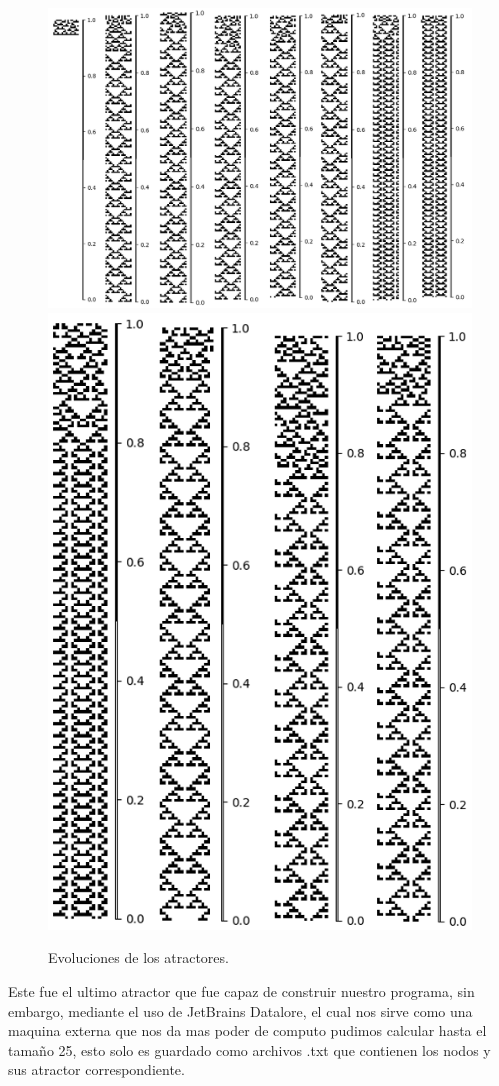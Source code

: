 \documentclass[11pt]{article}
\begin{document}
			\begin{figure}[H]
			\centering
			\includegraphics[scale=0.3]{resources/Atractores22/atractor_22_size_18_res.png}
			\includegraphics[scale=0.3]{resources/Atractores22/atractor_22_size_18_res1.png}
			\caption{Evoluciones de los atractores.}\label{fig:picture}
			\end{figure}
			Este fue el ultimo atractor que fue capaz de construir nuestro programa, sin embargo, mediante el uso de JetBrains Datalore, el cual nos sirve como una maquina externa que nos da mas poder de computo pudimos calcular hasta el tamaño 25, esto solo es guardado como archivos .txt que contienen los nodos y sus atractor correspondiente.
\end{document}
